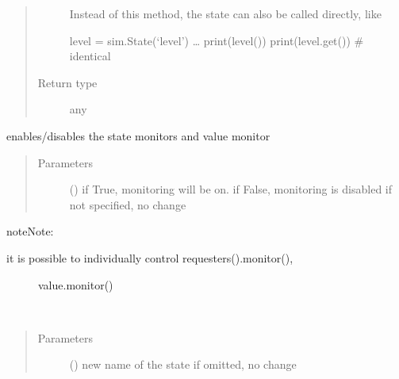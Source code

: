 \documentclass[letterpaper,10pt,english]{sphinxmanual}
\begin{document}
\begin{fulllineitems}
\begin{fulllineitems}
\begin{quote}
\begin{description}
 \textendash{} Instead of this method, the state can also be called directly, like 

level = sim.State(‘level’) 
… 
print(level()) 
print(level.get())  \# identical 


\item[{Return type}] \leavevmode
any

\end{description}\end{quote}

\end{fulllineitems}


\begin{fulllineitems}
\label{\detokenize{Reference:salabim.State.monitor}}
enables/disables the state monitors and value monitor
\begin{quote}\begin{description}
\item[{Parameters}] \leavevmode
{} () \textendash{} if True, monitoring will be on. 
if False, monitoring is disabled 
if not specified, no change

\end{description}\end{quote}

\begin{sphinxadmonition}{note}{Note:}\begin{description}
\item[{it is possible to individually control requesters().monitor(),}] \leavevmode
value.monitor()

\end{description}
\end{sphinxadmonition}

\end{fulllineitems}


\begin{fulllineitems}
\label{\detokenize{Reference:salabim.State.name}}~\begin{quote}\begin{description}
\item[{Parameters}] \leavevmode
{} () \textendash{} new name of the state
if omitted, no change


\end{description}
\end{quote}
\end{fulllineitems}
\end{fulllineitems}
\end{document}
